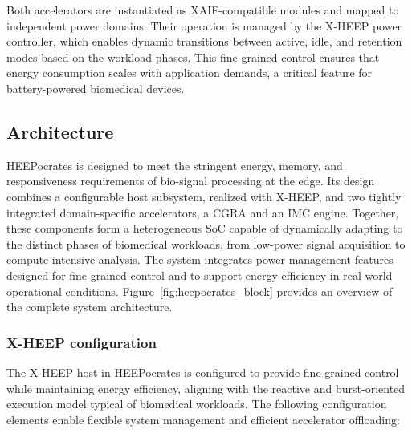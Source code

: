         Both accelerators are instantiated as XAIF-compatible modules and mapped to independent power domains. Their operation is managed by the \mbox{X-HEEP} power controller, which enables dynamic transitions between active, idle, and retention modes based on the workload phases. This fine-grained control ensures that energy consumption scales with application demands, a critical feature for battery-powered biomedical devices.

        \vspace{-1em}
        \subsection{Architecture}

            \mbox{HEEPocrates} is designed to meet the stringent energy, memory, and responsiveness requirements of bio-signal processing at the edge. Its design combines a configurable host subsystem, realized with \mbox{X-HEEP}, and two tightly integrated domain-specific accelerators, a CGRA and an IMC engine. Together, these components form a heterogeneous SoC capable of dynamically adapting to the distinct phases of biomedical workloads, from low-power signal acquisition to compute-intensive analysis. The system integrates power management features designed for fine-grained control and to support energy efficiency in real-world operational conditions. Figure~\ref{fig:heepocrates_block} provides an overview of the complete system architecture.
            
            \subsubsection*{X-HEEP configuration}
                
                The \mbox{X-HEEP} host in \mbox{HEEPocrates} is configured to provide fine-grained control while maintaining energy efficiency, aligning with the reactive and burst-oriented execution model typical of biomedical workloads. The following configuration elements enable flexible system management and efficient accelerator offloading:

